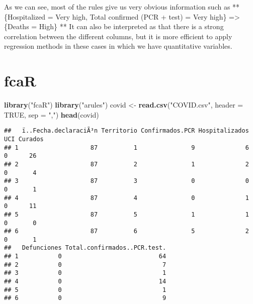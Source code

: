 \documentclass[
]{book}
\newenvironment{Shaded}{\begin{snugshade}}{\end{snugshade}}
\newcommand{\DataTypeTok}[1]{\textcolor[rgb]{0.13,0.29,0.53}{#1}}
\newcommand{\KeywordTok}[1]{\textcolor[rgb]{0.13,0.29,0.53}{\textbf{#1}}}
\newcommand{\NormalTok}[1]{#1}
\newcommand{\OperatorTok}[1]{\textcolor[rgb]{0.81,0.36,0.00}{\textbf{#1}}}
\newcommand{\OtherTok}[1]{\textcolor[rgb]{0.56,0.35,0.01}{#1}}
\newcommand{\StringTok}[1]{\textcolor[rgb]{0.31,0.60,0.02}{#1}}
\begin{document}
As we can see, most of the rules give us very obvious information such as ** \{Hospitalized = Very high, Total confirmed (PCR + test) = Very high\} =\textgreater{} \{Deaths = High\} **
It can also be interpreted as that there is a strong correlation between the different columns, but it is more efficient to apply regression methods in these cases in which we have quantitative variables.

\hypertarget{fcar}{%
\chapter{fcaR}\label{fcar}}

\begin{Shaded}
\begin{Highlighting}[]
\KeywordTok{library}\NormalTok{(}\StringTok{"fcaR"}\NormalTok{)}
\KeywordTok{library}\NormalTok{(}\StringTok{"arules"}\NormalTok{)}
\NormalTok{covid \textless{}{-}}\StringTok{ }\KeywordTok{read.csv}\NormalTok{(}\StringTok{"COVID.csv"}\NormalTok{, }\DataTypeTok{header =} \OtherTok{TRUE}\NormalTok{, }\DataTypeTok{sep =} \StringTok{","}\NormalTok{)}
\KeywordTok{head}\NormalTok{(covid)}
\end{Highlighting}
\end{Shaded}

\begin{verbatim}
##   ï..Fecha.declaraciÃ³n Territorio Confirmados.PCR Hospitalizados UCI Curados
## 1                    87          1               9              6   0      26
## 2                    87          2               1              2   0       4
## 3                    87          3               0              0   0       1
## 4                    87          4               0              1   0      11
## 5                    87          5               1              1   0       0
## 6                    87          6               5              2   0       1
##   Defunciones Total.confirmados..PCR.test.
## 1           0                           64
## 2           0                            7
## 3           0                            1
## 4           0                           14
## 5           0                            1
## 6           0                            9
\end{verbatim}

\begin{Shaded}
\end{Shaded}
\end{document}
